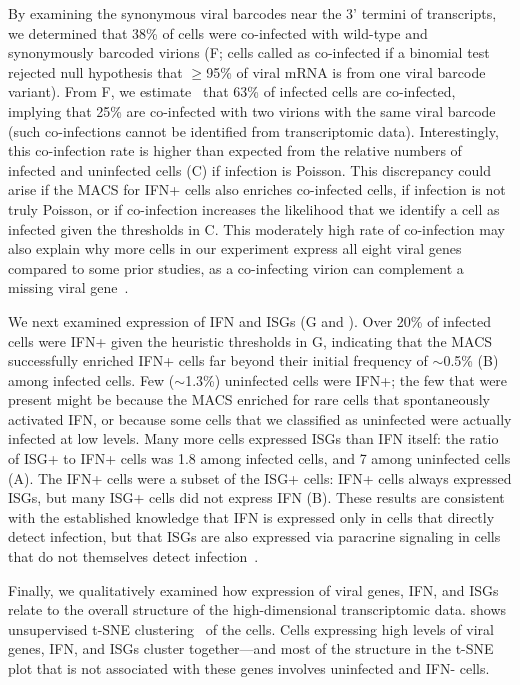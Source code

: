 \documentclass[9pt,lineno]{template}
\begin{document}
By examining the synonymous viral barcodes near the 3' termini of transcripts, we determined that 38\% of cells were co-infected with wild-type and synonymously barcoded virions (F; cells called as co-infected if a binomial test rejected null hypothesis that $\ge$95\% of viral mRNA is from one viral barcode variant).
From F, we estimate~\citep{bloom2018estimating} that 63\% of infected cells are co-infected, implying that 25\% are co-infected with two virions with the same viral barcode (such co-infections cannot be identified from transcriptomic data).
Interestingly, this co-infection rate is higher than expected from the relative numbers of infected and uninfected cells (C) if infection is Poisson.
This discrepancy could arise if the MACS for IFN+ cells also enriches co-infected cells, if infection is not truly Poisson, or if co-infection increases the likelihood that we identify a cell as infected given the thresholds in C.
This moderately high rate of co-infection may also explain why more cells in our experiment express all eight viral genes compared to some prior studies, as a co-infecting virion can complement a missing viral gene~\citep{russell2018extreme}. 

We next examined expression of IFN and ISGs (G and ).
Over 20\% of infected cells were IFN+ given the heuristic thresholds in G, indicating that the MACS successfully enriched IFN+ cells far beyond their initial frequency of $\sim$0.5\% (B) among infected cells.
Few ($\sim$1.3\%) uninfected cells were IFN+; the few that were present might be because the MACS enriched for rare cells that spontaneously activated IFN, or because some cells that we classified as uninfected were actually infected at low levels.
Many more cells expressed ISGs than IFN itself: the ratio of ISG+ to IFN+ cells was 1.8 among infected cells, and 7 among uninfected cells (A).
The IFN+ cells were a subset of the ISG+ cells: IFN+ cells always expressed ISGs, but many ISG+ cells did not express IFN (B).
These results are consistent with the established knowledge that IFN is expressed only in cells that directly detect infection, but that ISGs are also expressed via paracrine signaling in cells that do not themselves detect infection~\citep{stetson2006type,honda2006type}.

Finally, we qualitatively examined how expression of viral genes, IFN, and ISGs relate to the overall structure of the high-dimensional transcriptomic data.
 shows unsupervised t-SNE clustering~\citep{maaten2008visualizing} of the cells.
Cells expressing high levels of viral genes, IFN, and ISGs cluster together---and most of the structure in the t-SNE plot that is not associated with these genes involves uninfected and IFN- cells.
\end{document}
